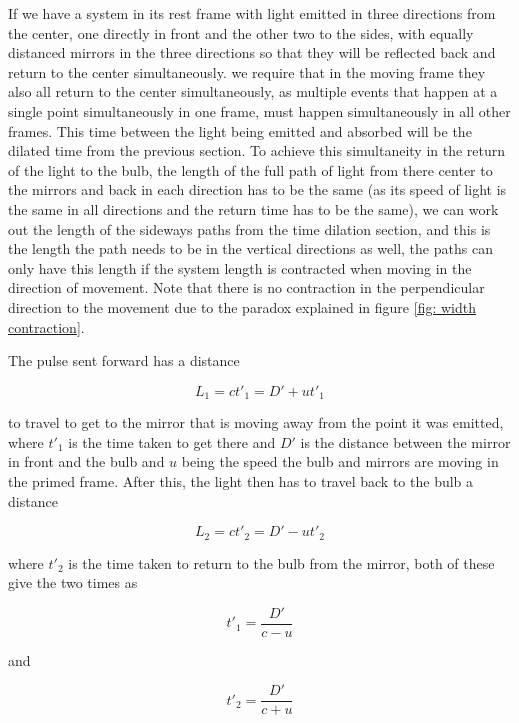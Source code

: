If we have a system in its rest frame with light emitted in three directions from the center, one directly in front and the other two to the sides, with equally distanced mirrors in the three directions so that they will be reflected back and return to the center simultaneously. we require that in the moving frame they also all return to the center simultaneously, as multiple events that happen at a single point simultaneously in one frame, must happen simultaneously in all other frames. This time between the light being emitted and absorbed will be the dilated time from the previous section. To achieve this simultaneity in the return of the light to the bulb, the length of the full path of light from there center to the mirrors and back in each direction has to be the same (as its speed of light is the same in all directions and the return time has to be the same), we can work out the length of the sideways paths from the time dilation section, and this is the length the path needs to be in the vertical directions as well, the paths can only have this length if the system length is contracted when moving in the direction of movement. Note that there is no contraction in the perpendicular direction to the movement due to the paradox explained in figure \ref{fig: width contraction}.

The pulse sent forward has a distance

\begin{equation}
	L_1= ct'_1= D' + ut'_1
\end{equation}

to travel to get to the mirror that is moving away from the point it was emitted, where $t'_1$ is the time taken to get there and $D'$ is the distance between the mirror in front and the bulb and $u$ being the speed the bulb and mirrors are moving in the primed frame. After this, the light then has to travel back to the bulb a distance

\begin{equation}
	L_2 = ct'_2= D' - ut'_2
\end{equation}

where $t'_2$ is the time taken to return to the bulb from the mirror, both of these give the two times as

\begin{equation}
	t'_1=\frac{D'}{c-u}
\end{equation}

and

\begin{equation}
	t'_2=\frac{D'}{c+u}
\end{equation}

